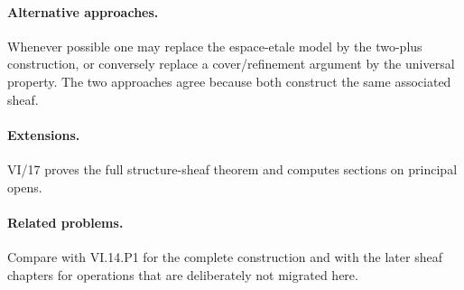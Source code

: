 \paragraph{Alternative approaches.}
Whenever possible one may replace the espace-etale model by the two-plus construction, or conversely replace a cover/refinement argument by the universal property.  The two approaches agree because both construct the same associated sheaf.

\paragraph{Extensions.}
VI/17 proves the full structure-sheaf theorem and computes sections on principal opens.

\paragraph{Related problems.}
Compare with VI.14.P1 for the complete construction and with the later sheaf chapters for operations that are deliberately not migrated here.
\fi
